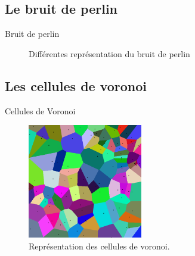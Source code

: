 \documentclass{beamer}
\begin{document}
\subsection{Le bruit de perlin}
\begin{frame}{Bruit de perlin}
  \begin{center}
    \begin{figure}
      \caption{Différentes représentation du bruit de perlin}
    \end{figure}
  \end{center}
\end{frame}

\subsection{Les cellules de voronoi}
\begin{frame}{Cellules de Voronoi}
  \begin{center}
    \begin{figure}
      \includegraphics[width=5cm]{Images/Images_Alexis/voronoi.png}
      \caption{Représentation des cellules de voronoi.}
    \end{figure}
  \end{center}
\end{frame}
\end{document}
